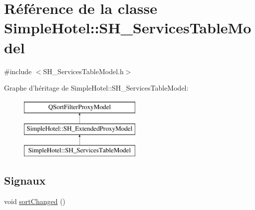 \hypertarget{classSimpleHotel_1_1SH__ServicesTableModel}{\section{Référence de la classe Simple\-Hotel\-:\-:S\-H\-\_\-\-Services\-Table\-Model}
\label{classSimpleHotel_1_1SH__ServicesTableModel}
}


{\ttfamily \#include $<$S\-H\-\_\-\-Services\-Table\-Model.\-h$>$}

Graphe d'héritage de Simple\-Hotel\-:\-:S\-H\-\_\-\-Services\-Table\-Model\-:\begin{figure}[H]
\begin{center}
\leavevmode
\includegraphics[height=3.000000cm]{classSimpleHotel_1_1SH__ServicesTableModel}
\end{center}
\end{figure}
\subsection*{Signaux}
\begin{DoxyCompactItemize}
\item 
void \hyperlink{classSimpleHotel_1_1SH__ExtendedProxyModel_adb9ae03a88cda8d9efbed47527b5186a}{sort\-Changed} ()
\end{DoxyCompactItemize}
